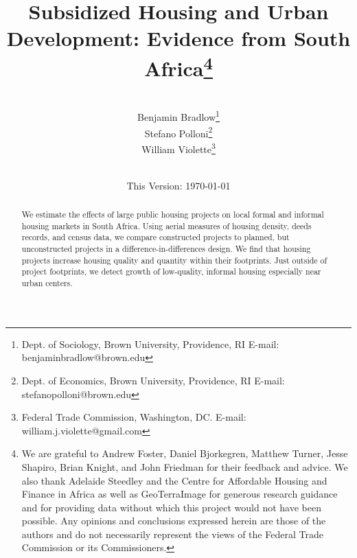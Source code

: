 \documentclass[12pt]{article}
\begin{document}
\begin{titlepage} 
\title{{Subsidized Housing and Urban Development: Evidence from South Africa}\thanks{We are grateful to Andrew Foster, Daniel Bjorkegren, Matthew Turner, Jesse Shapiro, Brian Knight, and John Friedman for their feedback and advice.  We also thank Adelaide Steedley and the Centre for Affordable Housing and Finance in Africa as well as GeoTerraImage for generous research guidance and for providing data without which this project would not have been possible.  Any opinions and conclusions expressed herein are those of the authors and do not necessarily represent the views of the Federal Trade Commission or its Commissioners.}}
\author{\\[3em] Benjamin Bradlow\thanks{Dept. of Sociology, Brown University, Providence, RI  E-mail: benjamin\textunderscore bradlow@brown.edu}\\
 Stefano Polloni\thanks{Dept. of Economics, Brown University, Providence, RI E-mail: stefano\textunderscore polloni@brown.edu}\\ 
  William Violette\thanks{Federal Trade Commission, Washington, DC. E-mail: william.j.violette@gmail.com} \\
 \\ 
  }
\vspace{30mm}
\date{\vspace{5mm}This Version: \today}
\maketitle
\begin{abstract}



	We estimate the effects of large public housing projects on local formal and informal housing markets in South Africa.  Using aerial measures of housing density, deeds records, and census data, we compare constructed projects to planned, but unconstructed projects in a difference-in-differences design.  We find that housing projects increase housing quality and quantity within their footprints.  Just outside of project footprints, we detect growth of low-quality, informal housing especially near urban centers.


\bigskip
\end{abstract}
\setcounter{page}{0}
\thispagestyle{empty}
\end{titlepage}
\pagebreak \newpage
\end{document}
